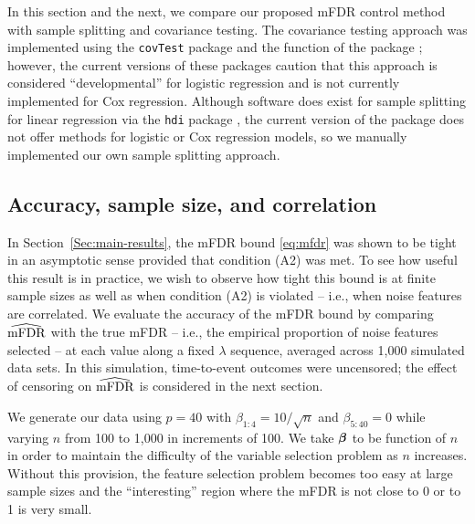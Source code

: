 In this section and the next, we compare our proposed mFDR control method with sample splitting and covariance testing.  The covariance testing approach was implemented using the {\tt covTest} package \citep{CovTest} and the  function of the  package \citep{Selective_Inference}; however, the current versions of these packages caution that this approach is considered ``developmental'' for logistic regression and is not currently implemented for Cox regression.  Although software does exist for sample splitting for linear regression via the {\tt hdi} package \cite{Dezeure2015}, the current version of the package does not offer methods for logistic or Cox regression models, so we manually implemented our own sample splitting approach.

\subsection{Accuracy, sample size, and correlation}
\label{Sec:accuracy}

In Section~\ref{Sec:main-results}, the mFDR bound \eqref{eq:mfdr} was shown to be tight in an asymptotic sense provided that condition (A2) was met.  To see how useful this result is in practice, we wish to observe how tight this bound is at finite sample sizes as well as when condition (A2) is violated -- i.e., when noise features are correlated.
We evaluate the accuracy of the mFDR bound by comparing $\widehat{\textrm{mFDR}}$ with the true mFDR -- i.e., the empirical proportion of noise features selected -- at each value along a fixed $\lambda$ sequence, averaged across 1,000 simulated data sets.
In this simulation, time-to-event outcomes were uncensored; the effect of censoring on $\widehat{\textrm{mFDR}}$ is considered in the next section.

We generate our data using $p = 40$ with $\beta_{1:4} = 10/\sqrt{n}$ and $\beta_{5:40} = 0$ while varying $n$ from 100 to 1,000 in increments of 100. We take $\boldsymbol{\beta}$ to be function of $n$ in order to maintain the difficulty of the variable selection problem as $n$ increases.
Without this provision, the feature selection problem becomes too easy at large sample sizes and the ``interesting'' region where the mFDR is not close to 0 or to 1 is very small.

